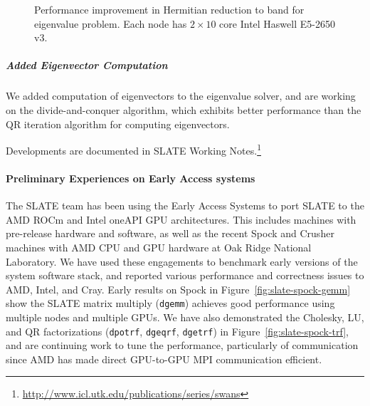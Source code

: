 \begin{figure}
    \centering
    \caption{Performance improvement in Hermitian reduction to band for
    eigenvalue problem. Each node has $2 \times 10$ core Intel Haswell E5-2650 v3.}
    \label{fig:slate-he2hb}
\end{figure}

\subparagraph{Added Eigenvector Computation}
We added computation of eigenvectors to the eigenvalue solver, and are
working on the divide-and-conquer algorithm, which exhibits
better performance than the QR iteration algorithm for computing
eigenvectors.

\noindent
Developments are documented in SLATE Working Notes.\footnote{
\url{http://www.icl.utk.edu/publications/series/swans}}

\paragraph{Preliminary Experiences on Early Access systems}

The SLATE team has been using the Early Access Systems to port SLATE to
the AMD ROCm and Intel oneAPI GPU architectures. This includes machines
with pre-release hardware and software, as well as the recent Spock and
Crusher machines with AMD CPU and GPU hardware at Oak Ridge National
Laboratory. We have used these engagements to benchmark early versions
of the system software stack, and reported various performance and
correctness issues to AMD, Intel, and Cray. Early results on Spock in
Figure~\ref{fig:slate-spock-gemm} show the SLATE matrix multiply
(\texttt{dgemm}) achieves good performance using multiple nodes and
multiple GPUs. We have also demonstrated the Cholesky, LU, and QR
factorizations (\texttt{dpotrf}, \texttt{dgeqrf}, \texttt{dgetrf}) in
Figure~\ref{fig:slate-spock-trf}, and are continuing work to tune the
performance, particularly of communication since AMD has made direct
GPU-to-GPU MPI communication efficient.

